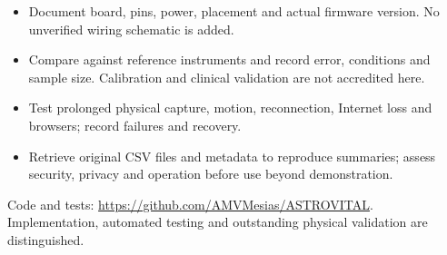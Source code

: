 \begin{itemize}
\item Document board, pins, power, placement and actual firmware version. No unverified wiring schematic is added.
\item Compare against reference instruments and record error, conditions and sample size. Calibration and clinical validation are not accredited here.
\item Test prolonged physical capture, motion, reconnection, Internet loss and browsers; record failures and recovery.
\item Retrieve original CSV files and metadata to reproduce summaries; assess security, privacy and operation before use beyond demonstration.
\end{itemize}
{\footnotesize\color{muted}Code and tests: \url{https://github.com/AMVMesias/ASTROVITAL}. Implementation, automated testing and outstanding physical validation are distinguished.}
